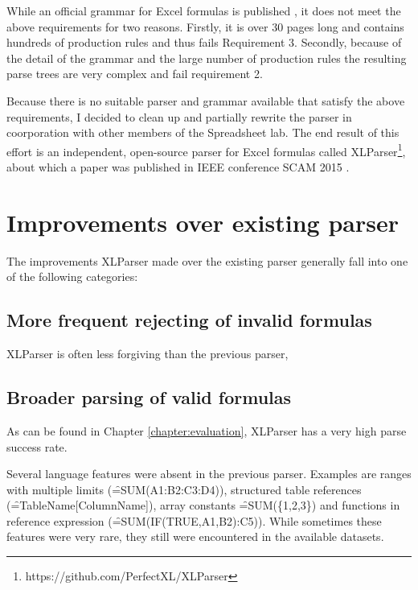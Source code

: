 While an official grammar for Excel formulas is published \cite{ExcelOfficialGrammar}, it does not meet the above requirements for two reasons.
Firstly, it is over 30 pages long and contains hundreds of production rules and thus fails Requirement 3.
Secondly, because of the detail of the grammar and the large number of production rules the resulting parse trees are very complex and fail requirement 2.

Because there is no suitable parser and grammar available that satisfy the above requirements, I decided to clean up and partially rewrite the parser in coorporation with other members of the Spreadsheet lab.
The end result of this effort is an independent, open-source parser for Excel formulas called XLParser\footnote{https://github.com/PerfectXL/XLParser}, about which a paper was published in IEEE conference SCAM 2015 \cite{xlparser}.

\section{Improvements over existing parser}


The improvements XLParser made over the existing parser generally fall into one of the following categories:

\subsection{More frequent rejecting of invalid formulas}

XLParser is often less forgiving than the previous parser,  

\subsection{Broader parsing of valid formulas}

As can be found in Chapter \ref{chapter:evaluation}, XLParser has a very high parse success rate.

Several language features were absent in the previous parser.
Examples are ranges with multiple limits (\f{=SUM(A1:B2:C3:D4)}), structured table references (\f{=TableName[ColumnName]}), array constants \f{=SUM(\{1,2,3\})} and functions in reference expression (\f{=SUM(IF(TRUE,A1,B2):C5)}).
While sometimes these features were very rare, they still were encountered in the available datasets.

